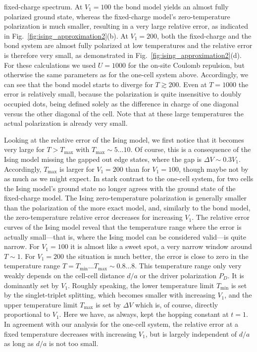 fixed-charge spectrum. At $V_1 = 100$ the bond model yields an almost fully
polarized ground state, whereas the fixed-charge model's zero-temperature
polarization is much smaller, resulting in a very large relative error, as
indicated in Fig.~\ref{fig:ising_approximation2}(b). At $V_1 = 200$, both the
fixed-charge and the bond system are almost fully polarized at low temperatures
and the relative error is therefore very small, as demonstrated in
Fig.~\ref{fig:ising_approximation2}(d). For these calculations we used $U=1000$
for the on-site Coulomb repulsion, but otherwise the same parameters as for the
one-cell system above. Accordingly, we can see that the bond model starts to
diverge for $T \gtrsim 200$. Even at $T=1000$ the error is relatively small,
because the polarization is quite insensitive to doubly occupied dots, being
defined solely as the difference in charge of one diagonal versus the other
diagonal of the cell. Note that at these large temperatures the actual
polarization is already very small.

Looking at the relative error of the Ising model, we first notice that it
becomes very large for $T > T_{\textrm{max}}$ with $T_{\textrm{max}} \sim 5
\ldots 10$. Of course, this is a consequence of the Ising model missing the
gapped out edge states, where the gap is $\Delta V \sim 0.3 V_1$. Accordingly,
$T_{\textrm{max}}$ is larger for $V_1 = 200$ than for $V_1 = 100$, though maybe
not by as much as we might expect. In stark contrast to the one-cell system, for
two cells the Ising model's ground state no longer agrees with the ground state
of the fixed-charge model. The Ising zero-temperature polarization is generally
smaller than the polarization of the more exact model, and, similarly to the
bond model, the zero-temperature relative error decreases for increasing $V_1$.
The relative error curves of the Ising model reveal that the temperature range
where the error is actually small---that is, where the Ising model can be
considered valid---is quite narrow. For $V_1 = 100$ it is almost like a sweet
spot, a very narrow window around $T \sim 1$. For $V_1 = 200$ the situation is
much better, the error is close to zero in the temperature range $T =
T_{\textrm{min}} \ldots T_{\textrm{max}} \sim 0.8 \ldots 8$. This temperature
range only very weakly depends on the cell-cell distance $d/a$ or the driver
polarization $P_D$. It is dominantly set by $V_1$.  Roughly speaking, the lower
temperature limit $T_{\textrm{min}}$ is set by the singlet-triplet splitting,
which becomes smaller with increasing $V_1$, and the upper temperature limit
$T_{\textrm{max}}$ is set by $\Delta V$ which is, of course, directly
proportional to $V_1$. Here we have, as always, kept the hopping constant at
$t=1$. In agreement with our analysis for the one-cell system, the relative
error at a fixed temperature decreases with increasing $V_1$, but is largely
independent of $d/a$ as long as $d/a$ is not too small.

